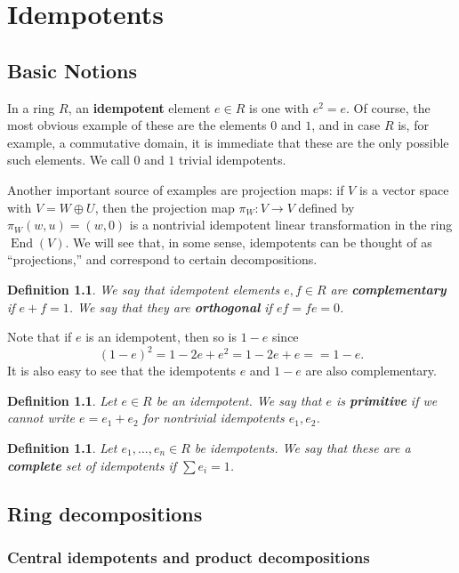 \documentclass[12pt]{report}
\theoremstyle{plain}
\newtheorem{defn}[thm]{Definition}
\newcommand{\oper}[1]{\operatorname{#1}}
\newcommand{\End}{\oper{End}}
\newcommand{\Xb}[1]{\textbf{#1}\index{#1}}
\begin{document}
\chapter{Idempotents}

\section{Basic Notions}

In a ring $R$, an \Xb{idempotent} element $e \in R$ is one with $e^2 = e$. Of
course, the most obvious example of these are the elements $0$ and $1$, and
in case $R$ is, for example, a commutative domain, it is immediate that
these are the only possible such elements. We call $0$ and $1$ trivial
idempotents.

Another important source of examples are projection maps: if $V$ is a
vector space with $V = W \oplus U$, then the projection map $\pi_W : V \to
V$ defined by $\pi_W(w, u) = (w, 0)$ is a nontrivial idempotent linear
transformation in the ring $\End(V)$. We will see that, in some sense,
idempotents can be thought of as ``projections,'' and correspond to certain
decompositions.

\begin{defn}
We say that idempotent elements $e, f \in R$ are \textbf{complementary} if
$e + f = 1$. We say that they are \textbf{orthogonal} if $ef = fe = 0$.
\end{defn}

Note that if $e$ is an idempotent, then so is $1 - e$ since
\[(1 - e)^2 = 1 - 2e + e^2 = 1 - 2e + e = = 1 - e.\]
It is also easy to see that the idempotents $e$ and $1 - e$ are also
complementary.

\begin{defn}
Let $e \in R$ be an idempotent. We say that $e$ is \textbf{primitive} if we
cannot write $e = e_1 + e_2$ for nontrivial idempotents $e_1, e_2$.
\end{defn}

\begin{defn}
Let $e_1, \ldots, e_n \in R$ be idempotents. We say that these are a
\textbf{complete} set of idempotents if $\sum e_i = 1$.
\end{defn}

\section{Ring decompositions}

\subsection{Central idempotents and product decompositions}
\end{document}
